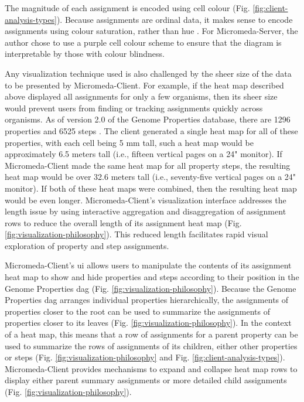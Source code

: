 The magnitude of each assignment is encoded using cell colour (Fig. \ref{fig:client-analysis-types}). Because assignments are ordinal data, it makes sense to encode assignments using colour saturation, rather than hue \cite{munzner2015visualization}. For Micromeda-Server, the author chose to use a purple cell colour scheme to ensure that the diagram is interpretable by those with colour blindness.

Any visualization technique used is also challenged by the sheer size of the data to be presented by Micromeda-Client. For example, if the heat map described above displayed all assignments for only a few organisms, then its sheer size would prevent users from finding or tracking assignments quickly across organisms. As of version 2.0 of the Genome Properties database, there are 1296 properties and 6525 steps \cite{richardson2018genome}. The client generated a single heat map for all of these properties, with each cell being 5 mm tall, such a heat map would be approximately 6.5 meters tall (i.e., fifteen vertical pages on a 24" monitor). If Micromeda-Client made the same heat map for all property steps, the resulting heat map would be over 32.6 meters tall (i.e., seventy-five vertical pages on a 24" monitor). If both of these heat maps were combined, then the resulting heat map would be even longer. Micromeda-Client's visualization interface addresses the length issue by using interactive aggregation and disaggregation \cite{munzner2015visualization} of assignment rows to reduce the overall length of its assignment heat map (Fig. \ref{fig:visualization-philosophy}). This reduced length facilitates rapid visual exploration of property and step assignments.

Micromeda-Client's \gls{ui} allows users to manipulate the contents of its assignment heat map to show and hide properties and steps according to their position in the Genome Properties \gls{dag} \cite{richardson2018genome} (Fig. \ref{fig:visualization-philosophy}). Because the Genome Properties \gls{dag} arranges individual properties hierarchically, the assignments of properties closer to the root can be used to summarize the assignments of properties closer to its leaves (Fig. \ref{fig:visualization-philosophy}). In the context of a heat map, this means that a row of assignments for a parent property can be used to summarize the rows of assignments of its children, either other properties or steps (Fig. \ref{fig:visualization-philosophy} and Fig. \ref{fig:client-analysis-types}). Micromeda-Client provides mechanisms to expand and collapse heat map rows to display either parent summary assignments or more detailed child assignments (Fig. \ref{fig:visualization-philosophy}).

